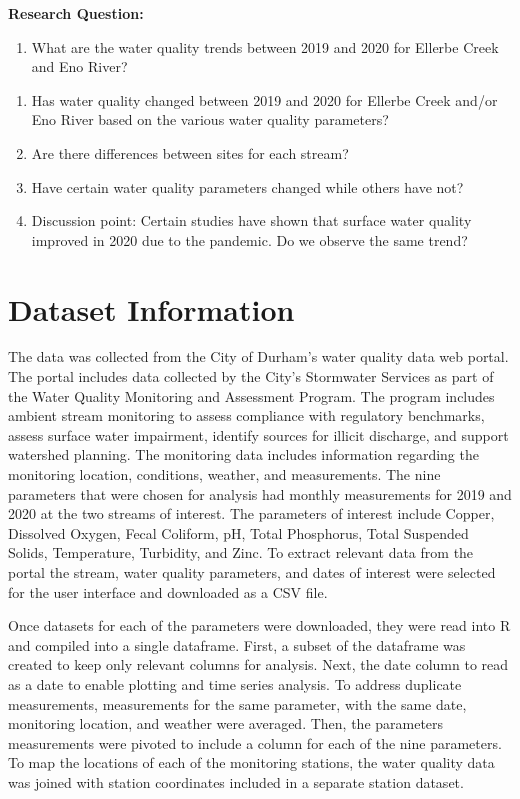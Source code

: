 \documentclass[
  12pt,
]{article}
\providecommand{\tightlist}{%
  \setlength{\itemsep}{0pt}\setlength{\parskip}{0pt}}
\begin{document}
\textbf{Research Question:}

\begin{enumerate}
\def\labelenumi{\arabic{enumi}.}
\tightlist
\item
  What are the water quality trends between 2019 and 2020 for Ellerbe
  Creek and Eno River?
\end{enumerate}

\begin{enumerate}
\def\labelenumi{\alph{enumi}.}
\tightlist
\item
  Has water quality changed between 2019 and 2020 for Ellerbe Creek
  and/or Eno River based on the various water quality parameters?
\item
  Are there differences between sites for each stream?
\item
  Have certain water quality parameters changed while others have not?
\item
  Discussion point: Certain studies have shown that surface water
  quality improved in 2020 due to the pandemic. Do we observe the same
  trend?
\end{enumerate}

\newpage

\hypertarget{dataset-information}{%
\section{Dataset Information}\label{dataset-information}}

The data was collected from the City of Durham's water quality data web
portal. The portal includes data collected by the City's Stormwater
Services as part of the Water Quality Monitoring and Assessment Program.
The program includes ambient stream monitoring to assess compliance with
regulatory benchmarks, assess surface water impairment, identify sources
for illicit discharge, and support watershed planning. The monitoring
data includes information regarding the monitoring location, conditions,
weather, and measurements. The nine parameters that were chosen for
analysis had monthly measurements for 2019 and 2020 at the two streams
of interest. The parameters of interest include Copper, Dissolved
Oxygen, Fecal Coliform, pH, Total Phosphorus, Total Suspended Solids,
Temperature, Turbidity, and Zinc. To extract relevant data from the
portal the stream, water quality parameters, and dates of interest were
selected for the user interface and downloaded as a CSV file.

Once datasets for each of the parameters were downloaded, they were read
into R and compiled into a single dataframe. First, a subset of the
dataframe was created to keep only relevant columns for analysis. Next,
the date column to read as a date to enable plotting and time series
analysis. To address duplicate measurements, measurements for the same
parameter, with the same date, monitoring location, and weather were
averaged. Then, the parameters measurements were pivoted to include a
column for each of the nine parameters. To map the locations of each of
the monitoring stations, the water quality data was joined with station
coordinates included in a separate station dataset.
\end{document}
